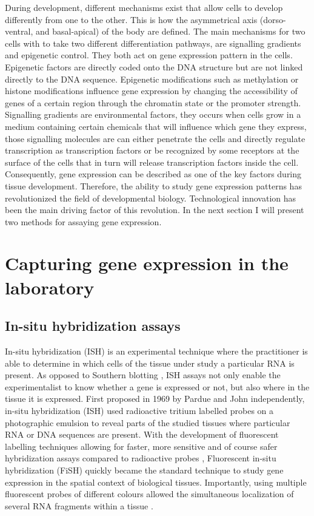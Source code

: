 	During development, different mechanisms exist that allow cells to develop differently from one to the other. This is how the asymmetrical axis (dorso-ventral, and basal-apical) of the body are defined. The main mechanisms for two cells with to take two different differentiation pathways, are signalling gradients and epigenetic control. They both act on gene expression pattern in the cells. Epigenetic factors are directly coded onto the DNA structure but are not linked directly to the DNA sequence. Epigenetic modifications such as methylation or histone modifications influence gene expression by changing the accessibility of genes of a certain region through the chromatin state or the promoter strength. Signalling gradients are environmental factors, they occurs when cells grow in a medium containing certain chemicals that will influence which gene they express, those signalling molecules are can either penetrate the cells and directly regulate transcription as transcription factors or be recognized by some receptors at the surface of the cells that in turn will release transcription factors inside the cell. \\
	
	Consequently, gene expression can be described as one of the key factors during tissue development. Therefore, the ability to study gene expression patterns has revolutionized the field of developmental biology. Technological innovation has been the main driving factor of this revolution. In the next section I will present two methods for assaying gene expression.


\section{Capturing gene expression in the laboratory}\label{sec:gene_expression_lab}
     \subsection{In-situ hybridization assays}
     In-situ hybridization (ISH) is an experimental technique where the practitioner is able to determine in which cells of the tissue under study a particular RNA is present. As opposed to Southern blotting \cite{southern75}, ISH assays not only enable the experimentalist to know whether a gene is expressed or not, but also where in the tissue it is expressed. First proposed in 1969 by Pardue \cite{pardue69} and John \cite{john69} independently, in-situ hybridization (ISH) used radioactive tritium labelled probes on a photographic emulsion to reveal parts of the studied tissues where particular RNA or DNA sequences are present. With the development of fluorescent labelling techniques \cite{landegent84,pinkel88} allowing for faster, more sensitive and of course safer hybridization assays compared to radioactive probes \cite{swiger96}, Fluorescent in-situ hybridization (FiSH) quickly became the standard technique to study gene expression in the spatial context of biological tissues. Importantly, using multiple fluorescent probes of different colours allowed the simultaneous localization of several RNA fragments within a tissue \cite{nederlof89}.\\
     
